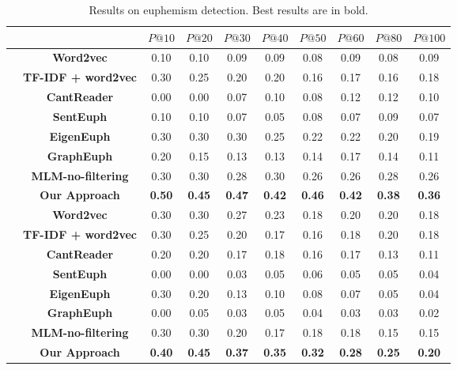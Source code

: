 \begin{table*}[ht!]
	\centering
	\small
	\caption{Results on euphemism detection. Best results are in bold.}
	\begin{tabular}{c|c|cccccccc}
		\toprule
		\multicolumn{2}{c}{}& \textbf{$P@10$}  & \textbf{$P@20$} &  \textbf{$P@30$} &  \textbf{$P@40$} & \textbf{$P@50$}  & \textbf{$P@60$} &  \textbf{$P@80$} &  \textbf{$P@100$}\\
		\midrule
		
		\multirow{8}{*}{\rotatebox[origin=c]{90}{\textbf{Drug}}}
		&\textbf{Word2vec} & 0.10 & 0.10 & 0.09 & 0.09 & 0.08 & 0.09 & 0.08 & 0.09 \\
		&\textbf{TF-IDF + word2vec} & 0.30 & 0.25 & 0.20 & 0.20 & 0.16 & 0.17 & 0.16 & 0.18 \\
		&\textbf{CantReader \cite{yuan2018reading}} & 0.00 & 0.00 & 0.07 & 0.10 & 0.08 & 0.12 & 0.12 & 0.10 \\
		&\textbf{SentEuph \cite{felt2020recognizing}} & 0.10 & 0.10 & 0.07 & 0.05 & 0.08 & 0.07 & 0.09 & 0.07 \\
		&\textbf{EigenEuph \cite{magu2018determining}} & 0.30 & 0.30 & 0.30 & 0.25 & 0.22 & 0.22 & 0.20 & 0.19 \\
		&\textbf{GraphEuph \cite{taylor2017surfacing}} & 0.20 & 0.15 & 0.13 & 0.13 & 0.14 & 0.17 & 0.14 & 0.11 \\
		&\textbf{MLM-no-filtering} & 0.30 & 0.30 & 0.28 & 0.30 & 0.26 & 0.26 & 0.28 & 0.26 \\
		&\textbf{Our Approach} & \textbf{0.50} & \textbf{0.45} & \textbf{0.47} & \textbf{0.42} & \textbf{0.46} & \textbf{0.42} & \textbf{0.38} & \textbf{0.36} \\
		\midrule
		
		\multirow{8}{*}{\rotatebox[origin=c]{90}{\textbf{Weapon}}}
		&\textbf{Word2vec} & 0.30 & 0.30 & 0.27 & 0.23 & 0.18 & 0.20 & 0.20 &  0.18\\
		&\textbf{TF-IDF + word2vec} & 0.30 & 0.25 & 0.20 & 0.17 &  0.16 & 0.18 & 0.20 & 0.18 \\
		&\textbf{CantReader \cite{yuan2018reading}} & 0.20 & 0.20 & 0.17 & 0.18 & 0.16 & 0.17&0.13 & 0.11\\
		&\textbf{SentEuph \cite{felt2020recognizing}} & 0.00 & 0.00 & 0.03 & 0.05 & 0.06 & 0.05 & 0.05 & 0.04\\
		&\textbf{EigenEuph \cite{magu2018determining}} & 0.30 & 0.20  & 0.13 & 0.10 & 0.08 & 0.07 & 0.05 & 0.04\\
		&\textbf{GraphEuph \cite{taylor2017surfacing}} &  0.00 & 0.05 & 0.03 & 0.05 & 0.04 & 0.03 & 0.03 & 0.02\\
		&\textbf{MLM-no-filtering} & 0.30 & 0.30 & 0.20 & 0.17 & 0.18 & 0.18 & 0.15 & 0.15 \\
		&\textbf{Our Approach} & \textbf{0.40} & \textbf{0.45} & \textbf{0.37} & \textbf{0.35} & \textbf{0.32} & \textbf{0.28} & \textbf{0.25} & \textbf{0.20} \\
		\midrule
		

\end{tabular}
\end{table*}

